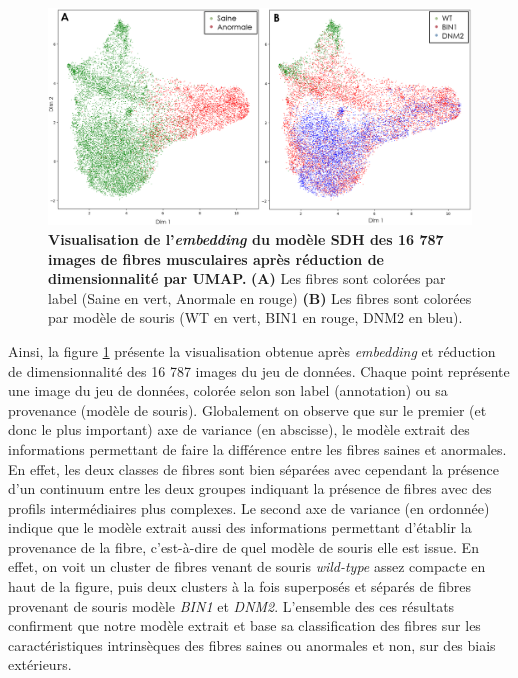 \begin{figure}[htbp]
 \centering
 \includegraphics[width=1\textwidth]{figures/umap_sdh.png}
 \caption[Visualisation de l'\textit{embedding} du modèle SDH]{\textbf{Visualisation de l'\textit{embedding} du modèle SDH des 16 787 images de fibres musculaires après réduction de dimensionnalité par UMAP.} \textbf{(A)} Les fibres sont colorées par label (Saine en vert, Anormale en rouge) \textbf{(B)} Les fibres sont colorées par modèle de souris (WT en vert, BIN1 en rouge, DNM2 en bleu).}
 \label{fig:umap_sdh}
\end{figure}

Ainsi, la figure \ref{fig:umap_sdh} présente la visualisation obtenue après \textit{embedding} et réduction de dimensionnalité des 16 787 images du jeu de données. Chaque point représente une image du jeu de données, colorée selon son label (annotation) ou sa provenance (modèle de souris). Globalement on observe que sur le premier (et donc le plus important) axe de variance (en abscisse), le modèle extrait des informations permettant de faire la différence entre les fibres saines et anormales. En effet, les deux classes de fibres sont bien séparées avec cependant la présence d'un continuum entre les deux groupes indiquant la présence de fibres avec des profils intermédiaires plus complexes. Le second axe de variance (en ordonnée) indique que le modèle extrait aussi des informations permettant d'établir la provenance de la fibre, c'est-à-dire de quel modèle de souris elle est issue. En effet, on voit un cluster de fibres venant de souris \textit{wild-type} assez compacte en haut de la figure, puis deux clusters à la fois superposés et séparés de fibres provenant de souris modèle \textit{BIN1} et \textit{DNM2}. L'ensemble des ces résultats confirment que notre modèle extrait et base sa classification des fibres sur les caractéristiques intrinsèques des fibres saines ou anormales et non, sur des biais extérieurs.

